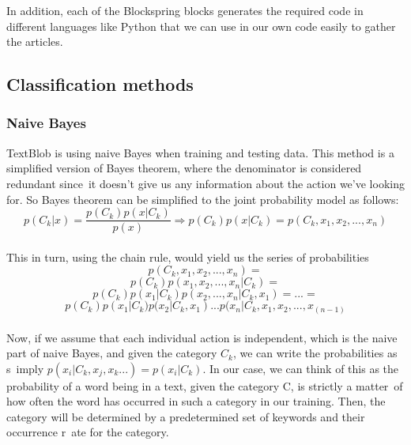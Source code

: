 \documentclass[a4paper]{article}
\begin{document}
In addition, each of the Blockspring blocks generates the required code in different languages like Python that we can use in our own code easily to gather the articles. 


\subsection{Classification methods}
\subsubsection{Naive Bayes}
TextBlob is using naive Bayes when training and testing data. This method is a simplified version of Bayes theorem, where the denominator is considered redundant since\
 it doesn't give us any information about the action we've looking for. So Bayes theorem can be simplified to the joint probability model as follows:
\\\[p(C_k|x) = \frac{p(C_k)p(x|C_k)}{p(x)} \Longrightarrow p(C_k)p(x|C_k) = p(C_k,x_1,x_2,...,x_n)\]\\
This in turn, using the chain rule, would yield us the series of probabilities \[p(C_k,x_1,x_2,...,x_n) = \]
\[p(C_k)p(x_1,x_2,...,x_n|C_k) =\]
\[p(C_k)p(x_1|C_k)p(x_2,...,x_n|C_k, x_1) = ... =\]
\[p(C_k)p(x_1|C_k)p(x_2|C_k, x_1) ... p(x_n|C_k, x_1, x_2,...,x_(n-1) \]\\
Now, if we assume that each individual action is independent, which is the naive part of naive Bayes, and given the category $C_k$, we can write the probabilities as s\
imply $p(x_i|C_k, x_j,x_k...) = p(x_i|C_k)$. In our case, we can think of this as the probability of a word being in a text, given the category C, is strictly a matter\
 of how often the word has occurred in such a category in our training. Then, the category will be determined by a predetermined set of keywords and their occurrence r\
ate for the category.
\end{document}
